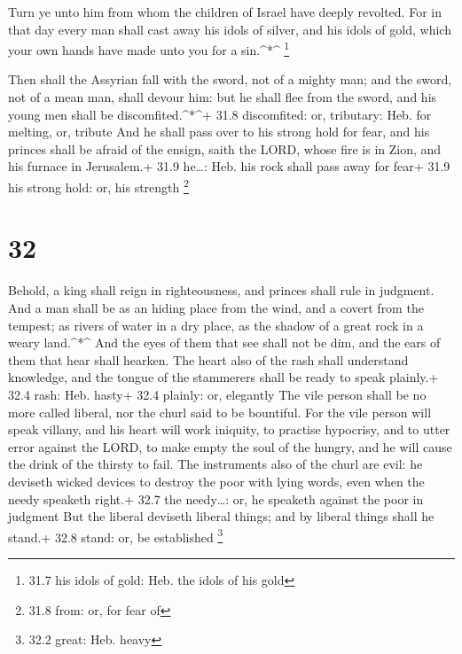  Turn ye unto him from whom the children of Israel have
deeply revolted.  For in that day every man shall cast away
his idols of silver, and his idols of gold, which your own hands have
made unto you for a sin.\^{}*\^{} \footnote{31.7 his idols of gold: Heb.
  the idols of his gold}

 Then shall the Assyrian fall with the sword, not of a
mighty man; and the sword, not of a mean man, shall devour him: but he
shall flee from the sword, and his young men shall be
discomfited.\^{}*\^{}+ 31.8 discomfited: or, tributary: Heb. for
melting, or, tribute  And he shall pass over to his strong
hold for fear, and his princes shall be afraid of the ensign, saith the
LORD, whose fire is in Zion, and his furnace in Jerusalem.+ 31.9
he\ldots: Heb. his rock shall pass away for fear+ 31.9 his strong hold:
or, his strength \footnote{31.8 from: or, for fear of}

\hypertarget{section-31}{%
\section{32}\label{section-31}}

 Behold, a king shall reign in righteousness, and princes
shall rule in judgment.  And a man shall be as an hiding
place from the wind, and a covert from the tempest; as rivers of water
in a dry place, as the shadow of a great rock in a weary land.\^{}*\^{}
 And the eyes of them that see shall not be dim, and the
ears of them that hear shall hearken.  The heart also of the
rash shall understand knowledge, and the tongue of the stammerers shall
be ready to speak plainly.+ 32.4 rash: Heb. hasty+ 32.4 plainly: or,
elegantly  The vile person shall be no more called liberal,
nor the churl said to be bountiful.  For the vile person
will speak villany, and his heart will work iniquity, to practise
hypocrisy, and to utter error against the LORD, to make empty the soul
of the hungry, and he will cause the drink of the thirsty to fail.
 The instruments also of the churl are evil: he deviseth
wicked devices to destroy the poor with lying words, even when the needy
speaketh right.+ 32.7 the needy\ldots: or, he speaketh against the poor
in judgment  But the liberal deviseth liberal things; and by
liberal things shall he stand.+ 32.8 stand: or, be established
\footnote{32.2 great: Heb. heavy}

